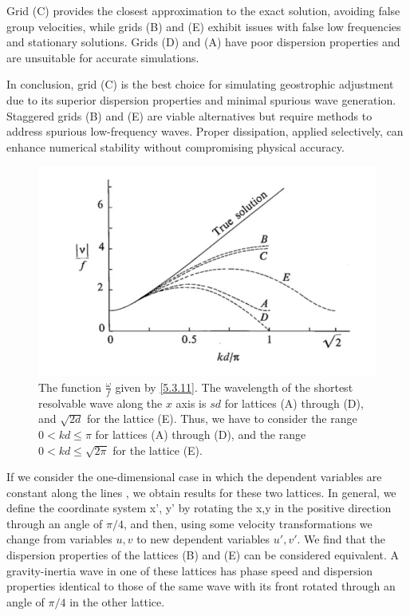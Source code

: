 Grid (C) provides the closest approximation to the exact solution, avoiding false group velocities, while grids (B) and (E) exhibit issues with false low frequencies and stationary solutions. Grids (D) and (A) have poor dispersion properties and are unsuitable for accurate simulations.

In conclusion, grid (C) is the best choice for simulating geostrophic adjustment due to its superior dispersion properties and minimal spurious wave generation. Staggered grids (B) and (E) are viable alternatives but require methods to address spurious low-frequency waves. Proper dissipation, applied selectively, can enhance numerical stability without compromising physical accuracy.

\begin{figure}[htpb]
    \centering
    \includegraphics[width=0.5\linewidth]{uploads/Screenshot 2024-11-14 124014.png}
    \caption{The function $\frac{\omega}{f}$ given by \ref{5.3.11}. The wavelength of the shortest resolvable wave along the $x$ axis is $sd$ for lattices (A) through (D), and $\sqrt{2d}$ for the lattice (E). Thus, we have to consider the range $0<kd\leq\pi$ for lattices (A) through (D), and the range $0<kd\leq\sqrt{2\pi}$ for the lattice (E).}
    \label{fig:5.3.2}
\end{figure}

 
 If we consider the one-dimensional case in which the dependent variables are constant along the lines 
, we obtain results for these two lattices. In general, we define the coordinate system x’, y’ by rotating the x,y in the positive direction through an angle of $\pi/4$, and then, using some velocity transformations we change from variables $u,v$ to new dependent variables $u',v'$. We find that the dispersion properties of the lattices (B) and (E) can be considered equivalent. A gravity-inertia wave in one of these lattices has phase speed and dispersion properties identical to those of the same wave with its front rotated through an angle of $\pi/4$ in the other lattice.


